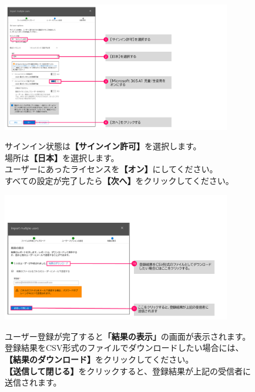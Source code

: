 \begin{figure}[h]
    \begin{minipage}{0.6\textwidth}
        \vspace{0cm}
        \includegraphics[width=10cm]{figures/CSV_Import-8.png}
    \end{minipage}
    \begin{minipage}{0.4\textwidth}
        サインイン状態は\textbf{【サインイン許可】}を選択します。\\
        場所は\textbf{【日本】}を選択します。\\
        ユーザーにあったライセンスを\textbf{【オン】}にしてください。\\
        すべての設定が完了したら\textbf{【次へ】}をクリックしてください。
    \end{minipage}
\end{figure}

\begin{figure}[h]
    \begin{minipage}{0.6\textwidth}
        \vspace{-1cm}
        \includegraphics[width=10cm]{figures/CSV_Import-9.png}
    \end{minipage}
    \begin{minipage}{0.4\textwidth}
        ユーザー登録が完了すると\textbf{「結果の表示」}の画面が表示されます。登録結果をCSV形式のファイルでダウンロードしたい場合には、\textbf{【結果のダウンロード】}をクリックしてください。\\
        \textbf{【送信して閉じる】}をクリックすると、登録結果が上記の受信者に送信されます。
    \end{minipage}
    \vspace{17cm}
\end{figure}

